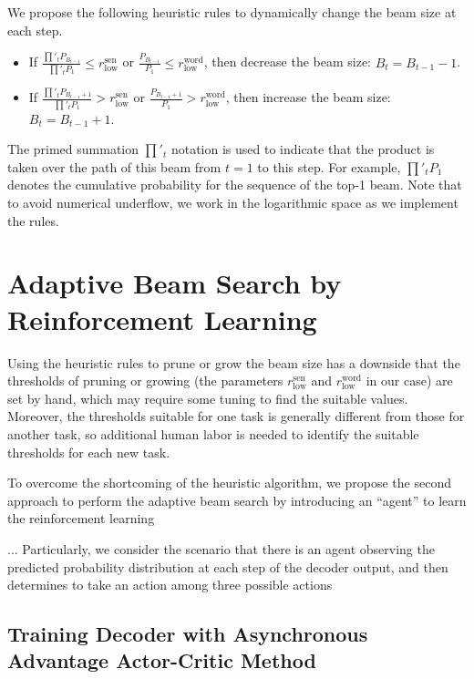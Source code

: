 \documentclass[11pt,a4paper]{article}
\begin{document}
We propose the following heuristic rules to dynamically change the beam size at each step.
\begin{itemize}
\item If $\displaystyle{\frac{\prod'_t P_{B_{t-1}}}{\prod'_t P_1}} \leq r^{\textrm{sen}}_{\textrm{low}}$ or $\displaystyle{\frac{P_{B_{t-1}}}{P_1}} \leq r^{\textrm{word}}_{\textrm{low}}$, then decrease the beam size: $B_t = B_{t-1} - 1$.
\item If $\displaystyle{\frac{\prod'_t P_{B_{t-1} + 1}}{\prod'_t P_1}} > r^{\textrm{sen}}_{\textrm{low}}$ or $\displaystyle{\frac{P_{B_{t-1} + 1}}{P_1}} > r^{\textrm{word}}_{\textrm{low}}$, then increase the beam size: $B_t = B_{t-1} + 1$.
\end{itemize}
The primed summation $\prod'_t$ notation is used to indicate that the product is taken over the path of this beam from $t = 1$ to this step. For example, $\prod'_t P_1$ denotes the cumulative probability for the sequence of the top-1 beam. Note that to avoid numerical underflow, we work in the logarithmic space as we implement the rules.



\section{Adaptive Beam Search by Reinforcement Learning}
\label{sec:RL}

Using the heuristic rules to prune or grow the beam size has a downside that the thresholds of pruning or growing (the parameters $r^{\textrm{sen}}_{\textrm{low}}$ and $r^{\textrm{word}}_{\textrm{low}}$ in our case) are set by hand, which may require some tuning to find the suitable values. Moreover, the thresholds suitable for one task is generally different from those for another task, so additional human labor is needed to identify the suitable thresholds for each new task.

To overcome the shortcoming of the heuristic algorithm, we propose the second approach to perform the adaptive beam search by introducing an ``agent'' to learn the  reinforcement learning

... Particularly, we consider the scenario that there is an agent observing the predicted probability distribution at each step of the decoder output, and then determines to take an action among three possible actions





\subsection{Training Decoder with Asynchronous Advantage Actor-Critic Method}
\end{document}
